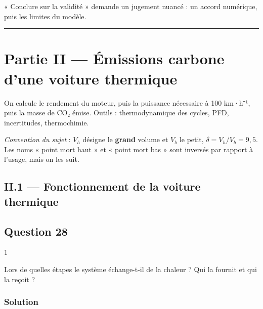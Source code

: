 \documentclass[11pt,a4paper]{article}
\begin{document}
\begin{jury}

« Conclure sur la validité » demande un jugement nuancé : un accord numérique, puis les limites du modèle.

\end{jury}

\begin{center}\rule{0.5\linewidth}{0.5pt}\end{center}

\hypertarget{partie-ii-uxe9missions-carbone-dune-voiture-thermique}{%
\section{Partie II --- Émissions carbone d'une voiture thermique}\label{partie-ii-uxe9missions-carbone-dune-voiture-thermique}}

On calcule le rendement du moteur, puis la puissance nécessaire à 100 km·h⁻¹, puis la masse de CO₂ émise. Outils : thermodynamique des cycles, PFD, incertitudes, thermochimie.

\emph{Convention du sujet} : \(V_h\) désigne le \textbf{grand} volume et \(V_b\) le petit, \(\delta=V_h/V_b=9{,}5\). Les noms « point mort haut » et « point mort bas » sont inversés par rapport à l'usage, mais on les suit.

\hypertarget{ii.1-fonctionnement-de-la-voiture-thermique}{%
\subsection{II.1 --- Fonctionnement de la voiture thermique}\label{ii.1-fonctionnement-de-la-voiture-thermique}}

\hypertarget{question-28}{%
\subsection{Question 28}\label{question-28}}

\begin{indication}{1}

Lors de quelles étapes le système échange-t-il de la chaleur ? Qui la fournit et qui la reçoit ?

\end{indication}

\hypertarget{solution-27}{%
\subsubsection{Solution}\label{solution-27}}
\end{document}
